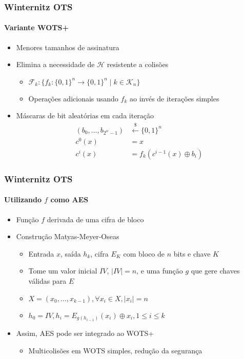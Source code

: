 \documentclass[12pt]{beamer}
\newcommand{\hh}{$\mathcal{H}$}
\newcommand{\binwds}[1]{\{0, 1\}^{#1}}
\begin{document}
\begin{frame}
  \frametitle{Winternitz OTS}
  \framesubtitle{Variante WOTS+}
  \begin{itemize}
    \item Menores tamanhos de assinatura
    \item Elimina a necessidade de \hh{} resistente a colisões
    \begin{itemize}
      \item $\mathcal{F}_k : \{f_k : \binwds{n} \longrightarrow \binwds{n} \mid k \in \mathcal{K}_n\}$
      \item Operações adicionais usando $f_k$ ao invés de iterações simples
    \end{itemize}
    \item Máscaras de bit aleatórias em cada iteração
    \begin{align*}
      (b_0, \dots, b_{2^w - 1}) &\stackrel{\$}{\longleftarrow} \{0, 1\}^{n} \\
      c^0(x) &= x \\
      c^i(x) &= f_k(c^{i-1}(x) \oplus b_i)
    \end{align*}
  \end{itemize}
\end{frame}

\begin{frame}
  \frametitle{Winternitz OTS}
  \framesubtitle{Utilizando $f$ como AES}
  \begin{itemize}
      \item Função $f$ derivada de uma cifra de bloco
      \item Construção Matyas-Meyer-Oseas \cite[9.41]{Menezes:1996:HAC:548089}
      \begin{itemize}
        \item Entrada $x$, saída $h_k$, cifra $E_K$ com bloco de $n$ bits e chave $K$
        \item Tome um valor inicial $IV$, $\vert IV \vert = n$, e uma função $g$ que gere chaves válidas para $E$
        \item $X = (x_0, \dots, x_{k - 1}), \forall x_i \in X, \vert x_i \vert = n$
        \item $h_0 = IV, h_i = E_{g(h_{i-1})}(x_i) \oplus x_i, 1 \leq i \leq k$
      \end{itemize}
      \item Assim, AES pode ser integrado ao WOTS+
      \begin{itemize}
        \item Multicolisões em WOTS simples, redução da segurança
      \end{itemize}
  \end{itemize}
\end{frame}
\end{document}
